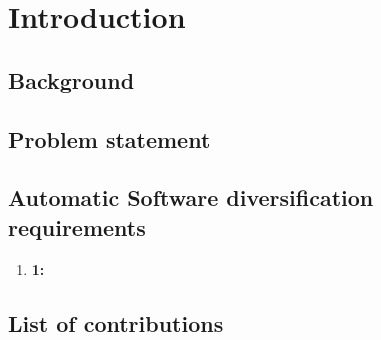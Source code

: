 
\chapter{Introduction}
\label{Intro}

\section{Background}

\section{Problem statement}

\section{Automatic Software diversification requirements}

\begin{enumerate}
	\item \textbf{1:} 
\end{enumerate}

\section{List of contributions}


